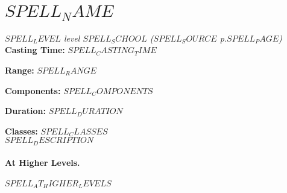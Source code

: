 \newpage
\section{$SPELL_NAME$}
\noindent\textit{$SPELL_LEVEL$ level $SPELL_SCHOOL$ ($SPELL_SOURCE$ p.$SPELL_PAGE$)}\\

\textbf{Casting Time:} $SPELL_CASTING_TIME$

\textbf{Range:} $SPELL_RANGE$
 
\textbf{Components:} $SPELL_COMPONENTS$

\textbf{Duration:} $SPELL_DURATION$

\textbf{Classes:} $SPELL_CLASSES$\\

$SPELL_DESCRIPTION$ \\

\paragraph{At Higher Levels.} $SPELL_AT_HIGHER_LEVELS$
